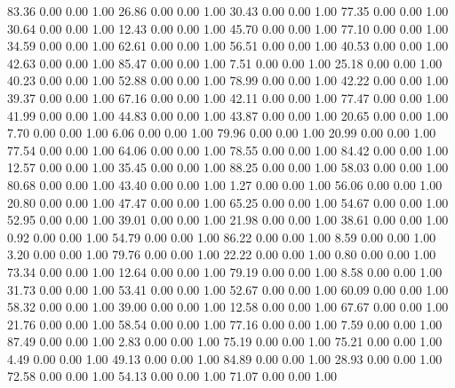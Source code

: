    83.36   0.00   0.00   1.00
   26.86   0.00   0.00   1.00
   30.43   0.00   0.00   1.00
   77.35   0.00   0.00   1.00
   30.64   0.00   0.00   1.00
   12.43   0.00   0.00   1.00
   45.70   0.00   0.00   1.00
   77.10   0.00   0.00   1.00
   34.59   0.00   0.00   1.00
   62.61   0.00   0.00   1.00
   56.51   0.00   0.00   1.00
   40.53   0.00   0.00   1.00
   42.63   0.00   0.00   1.00
   85.47   0.00   0.00   1.00
    7.51   0.00   0.00   1.00
   25.18   0.00   0.00   1.00
   40.23   0.00   0.00   1.00
   52.88   0.00   0.00   1.00
   78.99   0.00   0.00   1.00
   42.22   0.00   0.00   1.00
   39.37   0.00   0.00   1.00
   67.16   0.00   0.00   1.00
   42.11   0.00   0.00   1.00
   77.47   0.00   0.00   1.00
   41.99   0.00   0.00   1.00
   44.83   0.00   0.00   1.00
   43.87   0.00   0.00   1.00
   20.65   0.00   0.00   1.00
    7.70   0.00   0.00   1.00
    6.06   0.00   0.00   1.00
   79.96   0.00   0.00   1.00
   20.99   0.00   0.00   1.00
   77.54   0.00   0.00   1.00
   64.06   0.00   0.00   1.00
   78.55   0.00   0.00   1.00
   84.42   0.00   0.00   1.00
   12.57   0.00   0.00   1.00
   35.45   0.00   0.00   1.00
   88.25   0.00   0.00   1.00
   58.03   0.00   0.00   1.00
   80.68   0.00   0.00   1.00
   43.40   0.00   0.00   1.00
    1.27   0.00   0.00   1.00
   56.06   0.00   0.00   1.00
   20.80   0.00   0.00   1.00
   47.47   0.00   0.00   1.00
   65.25   0.00   0.00   1.00
   54.67   0.00   0.00   1.00
   52.95   0.00   0.00   1.00
   39.01   0.00   0.00   1.00
   21.98   0.00   0.00   1.00
   38.61   0.00   0.00   1.00
    0.92   0.00   0.00   1.00
   54.79   0.00   0.00   1.00
   86.22   0.00   0.00   1.00
    8.59   0.00   0.00   1.00
    3.20   0.00   0.00   1.00
   79.76   0.00   0.00   1.00
   22.22   0.00   0.00   1.00
    0.80   0.00   0.00   1.00
   73.34   0.00   0.00   1.00
   12.64   0.00   0.00   1.00
   79.19   0.00   0.00   1.00
    8.58   0.00   0.00   1.00
   31.73   0.00   0.00   1.00
   53.41   0.00   0.00   1.00
   52.67   0.00   0.00   1.00
   60.09   0.00   0.00   1.00
   58.32   0.00   0.00   1.00
   39.00   0.00   0.00   1.00
   12.58   0.00   0.00   1.00
   67.67   0.00   0.00   1.00
   21.76   0.00   0.00   1.00
   58.54   0.00   0.00   1.00
   77.16   0.00   0.00   1.00
    7.59   0.00   0.00   1.00
   87.49   0.00   0.00   1.00
    2.83   0.00   0.00   1.00
   75.19   0.00   0.00   1.00
   75.21   0.00   0.00   1.00
    4.49   0.00   0.00   1.00
   49.13   0.00   0.00   1.00
   84.89   0.00   0.00   1.00
   28.93   0.00   0.00   1.00
   72.58   0.00   0.00   1.00
   54.13   0.00   0.00   1.00
   71.07   0.00   0.00   1.00
